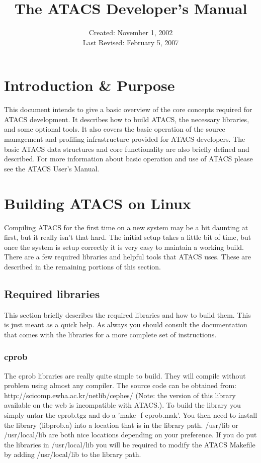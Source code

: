 \documentclass[titlepage,11pt]{article}
\title{The ATACS Developer's Manual}
\date{Created: November 1, 2002\\
  Last Revised: February 5, 2007
}
\begin{document}
  \maketitle

  \setcounter{tocdepth}{2} 

  \tableofcontents \newpage
  
   \setlength{\parindent}{0em} \setlength{\parskip}{10pt}
  
   \section{Introduction \& Purpose}
   This document intends to give a basic overview of the core concepts
  required for ATACS development. It describes how to build ATACS, the
  necessary libraries, and some optional tools. It also covers the basic
  operation of the source management and profiling infrastructure provided for
  ATACS developers. The basic ATACS data structures and core functionality are
  also briefly defined and described. For more information about basic
  operation and use of ATACS please see the ATACS User's Manual.

  \section{Building ATACS on Linux}
  Compiling ATACS for the first time on a new system may be a bit
  daunting at first, but it really isn't that hard.  The initial setup
  takes a little bit of time, but once the system is setup correctly it
  is very easy to maintain a working build.  There are a few required
  libraries and helpful tools that ATACS uses.  These are described in
  the remaining portions of this section.
  
  \subsection{Required libraries}
  This section briefly describes the required libraries and how to
  build them.  This is just meant as a quick help.  As always you
  should consult the documentation that comes with the libraries for
  a more complete set of instructions.
  
  \subsubsection{cprob}
  The cprob libraries are really quite simple to build. They will compile
without problem using almost any compiler. The source code can be obtained
from: http://scicomp.ewha.ac.kr/netlib/cephes/ (Note: the version of this
library available on the web is incompatible with ATACS.). To build the
library you simply untar the cprob.tgz and do a 'make -f cprob.mak'. You then
need to install the library (libprob.a) into a location that is in the library
path. /usr/lib or /usr/local/lib are both nice locations depending on your
preference. If you do put the libraries in /usr/local/lib you will be required
to modify the ATACS Makefile by adding /usr/local/lib to the library path.
  
\end{document}
